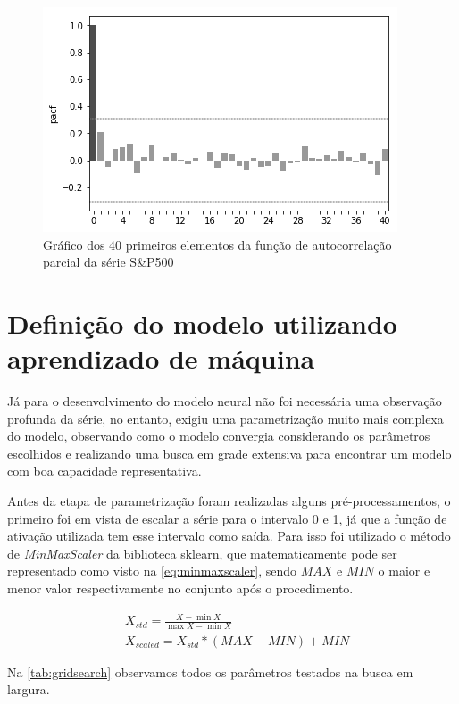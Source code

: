 \documentclass[
    12pt,
    oneside,
    a4paper,
    english,
    brazil
]{abntex2}
\begin{document}
\begin{figure}[ht]
    \centering
    \caption{Gráfico  dos 40  primeiros elementos  da função  de autocorrelação
    parcial da série S\&P500}\label{fig:sp500pacf}
    \includegraphics[width=.5\linewidth]{images/sp500pacf.png}
\end{figure}

\section{Definição do modelo utilizando aprendizado de máquina}

Já para  o desenvolvimento do modelo  neural não foi necessária  uma observação
profunda da  série, no entanto,  exigiu uma parametrização muito  mais complexa
do  modelo,  observando como  o  modelo  convergia considerando  os  parâmetros
escolhidos e realizando  uma busca em grade extensiva para  encontrar um modelo
com boa capacidade representativa.

Antes da etapa de parametrização  foram realizadas alguns pré-processamentos, o
primeiro foi  em vista  de escalar a  série para o  intervalo 0  e 1, já  que a
função  de  ativação  utilizada  tem  esse  intervalo  como  saída.  Para  isso
foi  utilizado o  método de  \textit{MinMaxScaler} da  biblioteca sklearn,  que
matematicamente pode ser representado  como visto na \autoref{eq:minmaxscaler},
sendo $MAX$ e  $MIN$ o maior e  menor valor respectivamente no  conjunto após o
procedimento.

\begin{equation}
    \begin{split}\label{eq:minmaxscaler}
        &X_{std} = \frac{X - \min X}{\max X-\min X}\\
        &X_{scaled} = X_{std} * (MAX-MIN)+MIN
    \end{split}
\end{equation}

Na \autoref{tab:gridsearch} observamos todos os parâmetros testados na busca em
largura.
\end{document}
